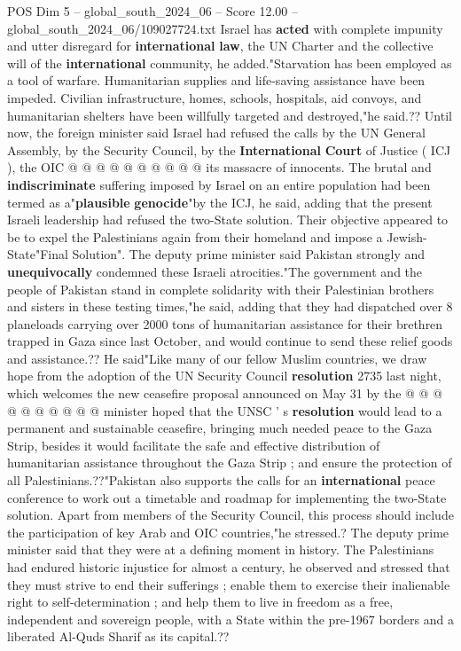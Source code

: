 \begin{textsample}{POS Dim 5 – global\_south\_2024\_06 – Score 12.00 – global\_south\_2024\_06/109027724.txt}
Israel has \textbf{acted} with complete impunity and utter disregard for \textbf{international} \textbf{law}, the UN Charter and the collective will of the \textbf{international} community, he added."Starvation has been employed as a tool of warfare.
Humanitarian supplies and life-saving assistance have been impeded.
Civilian infrastructure, homes, schools, hospitals, aid convoys, and humanitarian shelters have been willfully targeted and destroyed,"he said.??
Until now, the foreign minister said Israel had refused the calls by the UN General Assembly, by the Security Council, by the \textbf{International} \textbf{Court} of Justice ( ICJ ), the OIC @ @ @ @ @ @ @ @ @ @ its massacre of innocents.
The brutal and \textbf{indiscriminate} suffering imposed by Israel on an entire population had been termed as a"\textbf{plausible} \textbf{genocide}"by the ICJ, he said, adding that the present Israeli leadership had refused the two-State solution.
Their objective appeared to be to expel the Palestinians again from their homeland and impose a Jewish-State"Final Solution".
The deputy prime minister said Pakistan strongly and \textbf{unequivocally} condemned these Israeli atrocities."The government and the people of Pakistan stand in complete solidarity with their Palestinian brothers and sisters in these testing times,"he said, adding that they had dispatched over 8 planeloads carrying over 2000 tons of humanitarian assistance for their brethren trapped in Gaza since last October, and would continue to send these relief goods and assistance.??
He said"Like many of our fellow Muslim countries, we draw hope from the adoption of the UN Security Council \textbf{resolution} 2735 last night, which welcomes the new ceasefire proposal announced on May 31 by the @ @ @ @ @ @ @ @ @ @ minister hoped that the UNSC ' s \textbf{resolution} would lead to a permanent and sustainable ceasefire, bringing much needed peace to the Gaza Strip, besides it would facilitate the safe and effective distribution of humanitarian assistance throughout the Gaza Strip ; and ensure the protection of all Palestinians.??"Pakistan also supports the calls for an \textbf{international} peace conference to work out a timetable and roadmap for implementing the two-State solution.
Apart from members of the Security Council, this process should include the participation of key Arab and OIC countries,"he stressed.?
The deputy prime minister said that they were at a defining moment in history.
The Palestinians had endured historic injustice for almost a century, he observed and stressed that they must strive to end their sufferings ; enable them to exercise their inalienable right to self-determination ; and help them to live in freedom as a free, independent and sovereign people, with a State within the pre-1967 borders and a liberated Al-Quds Sharif as its capital.??

\end{textsample}
